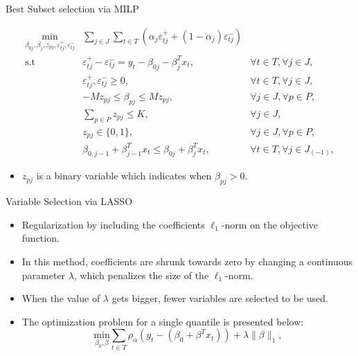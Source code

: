 \begin{frame}{Best Subset selection via MILP}

\[
\begin{array}{lll}
 \underset{\beta_{0j},\beta_j,z_{p j}, \varepsilon_{t j}^{+},\varepsilon_{t j}^{-}}{\text{min}} & \sum_{j \in J} \sum_{t\in T}\left(\alpha_j\varepsilon_{t j}^{+}+(1-\alpha_j)\varepsilon_{t j}^{-}\right)  & \\
\mbox{s.t } & \varepsilon_{t j}^{+}-\varepsilon_{t j}^{-}=y_{t}-\beta_{0 j}-\beta_{j}^T x_{t},& \forall t \in T ,\forall j \in J, \\
& \varepsilon_{t j}^{+},\varepsilon_{t j}^{-}\geq0,&\forall t \in T ,\forall j \in J, \\
& - M z_{p j} \leq \beta_{p j} \leq M z_{p j},& \forall j \in J, \forall p\in P, \\
& \sum_{p \in P} z_{p j} \leq K, &  \forall j \in J, \\
& z_{p j} \in \{0,1\},& \forall j \in J, \forall p\in P,\\
& \beta_{0,j-1} + \beta_{j-1}^T x_{t} \leq \beta_{0j} + \beta_{j}^T x_{t}, & \forall t \in T, \forall j \in J_{(-1)},
\end{array}
\]

\begin{itemize}
\tightlist
\item
  \(z_{pj}\) is a binary variable which indicates when
  \(\beta_{pj} > 0\).
\end{itemize}

\end{frame}

\begin{frame}{Variable Selection via LASSO}

\begin{itemize}
\tightlist
\item
  Regularization by including the coefficients \(\ell_1\)-norm on the
  objective function.
\item
  In this method, coefficients are shrunk towards zero by changing a
  continuous parameter \(\lambda\), which penalizes the size of the
  \(\ell_1\)-norm.\\
\item
  When the value of \(\lambda\) gets bigger, fewer variables are
  selected to be used.
\item
  The optimization problem for a single quantile is presented below: \[
  \underset{\beta_{0},\beta}{\text{min}} \sum_{t\in T}\rho_{\alpha}(y_{t}-(\beta_0 + \beta^T x_t))+\lambda\|\beta\|_{1},
  \]
\end{itemize}

\end{frame}

